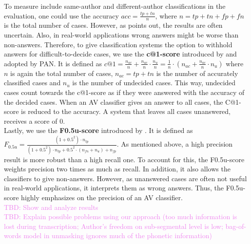 To measure include same-author and different-author classifications in the evaluation, one could use the accuracy $acc = \frac{tp+tn}{n}$, where $n = tp+tn+fp+fn$ is the total number of cases.
However, as \cite{bevendorff2019unmaskingShortTexts} points out, the results are often uncertain.
Also, in real-world applications wrong answers might be worse than non-answers.
Therefore, to give classification systems the option to withhold answers for difficult-to-decide cases, we use the \textbf{c@1-score} introduced by \cite{penas2011c_at_1} and adopted by PAN.
It is defined as $c@1 = \frac{n_{ac}}{n}+\frac{n_{ac}}{n}\cdot{}\frac{n_u}{n} = \frac{1}{n}\cdot{}\left(n_{ac}+\frac{n_{ac}}{n}\cdot{}n_u\right)$ where $n$ is again the total number of cases, $n_{ac} = tp+tn$ is the number of accurately classified cases and $n_u$ is the number of undecided cases.
This way, undecided cases count towards the c@1-score as if they were answered with the accuracy of the decided cases.
When an AV classifier gives an answer to all cases, the C@1-score is reduced to the accuracy.
A system that leaves all cases unanswered, receives a score of 0.\\
Lastly, we use the \textbf{F0.5u-score} introduced by \cite{bevendorff2019unmaskingShortTexts}.
It is defined as $F_{0.5u} = \frac{(1+0.5^2)\cdot{}n_{tp}}{(1+0.5^2)\cdot{}n_{tp}+0.5^2\cdot{}(n_{fn}+n_u)+n_{fp}}$.
As mentioned above, a high precision result is more robust than a high recall one.
To account for this, the F0.5u-score weights precision two times as much as recall.
In addition, it also allows the classifiers to give non-answers.
However, as unanswered cases are often not useful in real-world applications, it interprets them as wrong answers.
Thus, the F0.5u-score highly emphasizes on the precision of an AV classifier.\\

\textcolor{violet}{
TBD: Show and analyze results\\
TBD: Explain possible problems using our approach (too much information is lost during transcription; Author's freedom on sub-segmental level is low; bag-of-words model in unmasking ignores much of the phonetic information)\\
}



